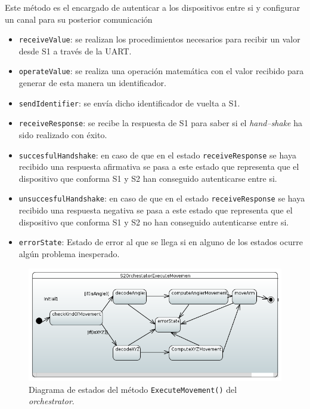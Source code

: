 Este método es el encargado de autenticar a los dispositivos entre si y configurar un canal para su posterior comunicación

\begin{itemize}
    \item \texttt{receiveValue}: se realizan los procedimientos necesarios para recibir un valor desde \ac{S1} a través de la \ac{UART}.
    \item \texttt{operateValue}: se realiza una operación matemática con el valor recibido para generar de esta manera un identificador.
    \item \texttt{sendIdentifier}: se envía dicho identificador de vuelta a \ac{S1}.
    \item \texttt{receiveResponse}: se recibe la respuesta de \ac{S1} para saber si el \textit{hand--shake} ha sido realizado con éxito.
    \item \texttt{succesfulHandshake}: en caso de que en el estado
    \texttt{receiveResponse} se haya recibido una respuesta afirmativa se pasa a este estado que representa que el dispositivo que conforma S1 y S2 han conseguido autenticarse entre si.
    \item \texttt{unsuccesfulHandshake}: en caso de que en el estado \texttt{receiveResponse} se haya recibido una respuesta negativa se pasa a este estado que representa que el dispositivo que conforma S1 y S2 no han conseguido autenticarse
    entre si.
    \item \texttt{errorState}: Estado de error al que se llega si en alguno de los estados ocurre algún problema inesperado. 
\end{itemize}

\begin{figure}[H]
    \centering
    \includegraphics[width=1\linewidth]{pictures/S2OrchestratorExecuteMovement.PNG}
    \caption{Diagrama de estados del método \texttt{ExecuteMovement()} del \textit{orchestrator}.}
    \label{fig:fun_execute_movement_orchestrator}
\end{figure}

